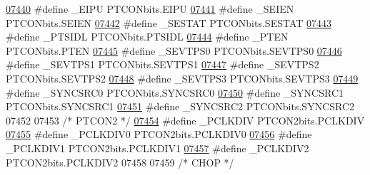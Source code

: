 \begin{DoxyCode}
\hypertarget{a00015_source_l07440}{}\hyperlink{a00015_a2086b1490a41d4478e1c52323d4c8988}{07440} \textcolor{preprocessor}{#define \_EIPU PTCONbits.EIPU}
\hypertarget{a00015_source_l07441}{}\hyperlink{a00015_ab1e8ad2a6ffd055ab674686fecc4279d}{07441} \textcolor{preprocessor}{#define \_SEIEN PTCONbits.SEIEN}
\hypertarget{a00015_source_l07442}{}\hyperlink{a00015_a90c824b0bfabfb02911e86dd0ec11b12}{07442} \textcolor{preprocessor}{#define \_SESTAT PTCONbits.SESTAT}
\hypertarget{a00015_source_l07443}{}\hyperlink{a00015_a3ac4db750e7d86cae991f49c861ce05b}{07443} \textcolor{preprocessor}{#define \_PTSIDL PTCONbits.PTSIDL}
\hypertarget{a00015_source_l07444}{}\hyperlink{a00015_afb75f021998cbc03eee8058f7a46c96a}{07444} \textcolor{preprocessor}{#define \_PTEN PTCONbits.PTEN}
\hypertarget{a00015_source_l07445}{}\hyperlink{a00015_a043501790954685d949022c30fd40206}{07445} \textcolor{preprocessor}{#define \_SEVTPS0 PTCONbits.SEVTPS0}
\hypertarget{a00015_source_l07446}{}\hyperlink{a00015_a56ab3ff6ef6d2bc375fe9a828026dec0}{07446} \textcolor{preprocessor}{#define \_SEVTPS1 PTCONbits.SEVTPS1}
\hypertarget{a00015_source_l07447}{}\hyperlink{a00015_a87ea00097e256416c2fdbc56e9e00c02}{07447} \textcolor{preprocessor}{#define \_SEVTPS2 PTCONbits.SEVTPS2}
\hypertarget{a00015_source_l07448}{}\hyperlink{a00015_ad755e6ada210afb9980e1e76304ac24a}{07448} \textcolor{preprocessor}{#define \_SEVTPS3 PTCONbits.SEVTPS3}
\hypertarget{a00015_source_l07449}{}\hyperlink{a00015_a9e16fd68bdf77b6f43e5e02fbd82c345}{07449} \textcolor{preprocessor}{#define \_SYNCSRC0 PTCONbits.SYNCSRC0}
\hypertarget{a00015_source_l07450}{}\hyperlink{a00015_a8f8391ca63f533abc501fe7fad71938f}{07450} \textcolor{preprocessor}{#define \_SYNCSRC1 PTCONbits.SYNCSRC1}
\hypertarget{a00015_source_l07451}{}\hyperlink{a00015_a3818ad87a079894f1df204f42d98a6e9}{07451} \textcolor{preprocessor}{#define \_SYNCSRC2 PTCONbits.SYNCSRC2}
07452 
07453 \textcolor{comment}{/* PTCON2 */}
\hypertarget{a00015_source_l07454}{}\hyperlink{a00015_a92eb607fef87c01864654243be658181}{07454} \textcolor{preprocessor}{#define \_PCLKDIV PTCON2bits.PCLKDIV}
\hypertarget{a00015_source_l07455}{}\hyperlink{a00015_acdbca7b9a3fc5d373e0e67f13d0b0078}{07455} \textcolor{preprocessor}{#define \_PCLKDIV0 PTCON2bits.PCLKDIV0}
\hypertarget{a00015_source_l07456}{}\hyperlink{a00015_a51ab34a69746a63ec0af77f4890036b4}{07456} \textcolor{preprocessor}{#define \_PCLKDIV1 PTCON2bits.PCLKDIV1}
\hypertarget{a00015_source_l07457}{}\hyperlink{a00015_a05052726e537bbf995f9d7986f71dcee}{07457} \textcolor{preprocessor}{#define \_PCLKDIV2 PTCON2bits.PCLKDIV2}
07458 
07459 \textcolor{comment}{/* CHOP */}

\end{DoxyCode}
